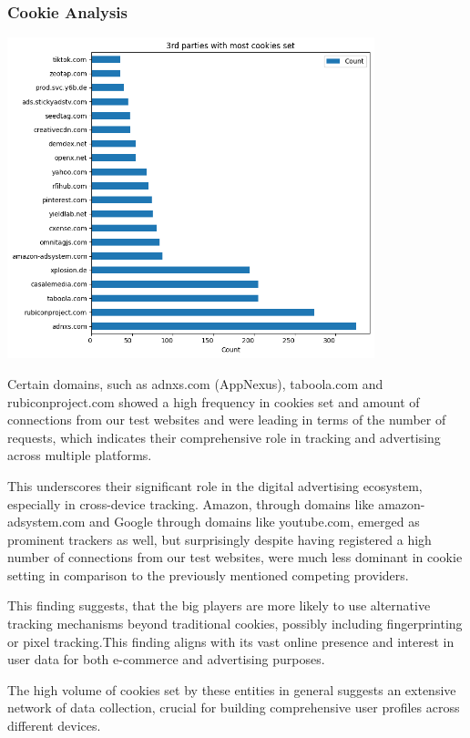 \subsubsection{Cookie Analysis}
\includegraphics[width=0.8\textwidth]{./assets/thirdpartieswithmostcookiesset.png}
\vspace{0.8cm}

Certain domains, such as adnxs.com (AppNexus), taboola.com and rubiconproject.com showed a high frequency in cookies set and amount of connections from our test websites and were leading in terms of the number of requests, which indicates their comprehensive role in tracking and advertising across multiple platforms.

This underscores their significant role in the digital advertising ecosystem, especially in cross-device tracking. Amazon, through domains like amazon-adsystem.com and Google through domains like youtube.com, emerged as prominent trackers as well, but surprisingly despite having registered a high number of connections from our test websites, were much less dominant in cookie setting in comparison to the previously mentioned competing providers. 

This finding suggests, that the big players are more likely to use alternative tracking mechanisms beyond traditional cookies, possibly including fingerprinting or pixel tracking.This finding aligns with its vast online presence and interest in user data for both e-commerce and advertising purposes.

The high volume of cookies set by these entities in general suggests an extensive network of data collection, crucial for building comprehensive user profiles across different devices.



